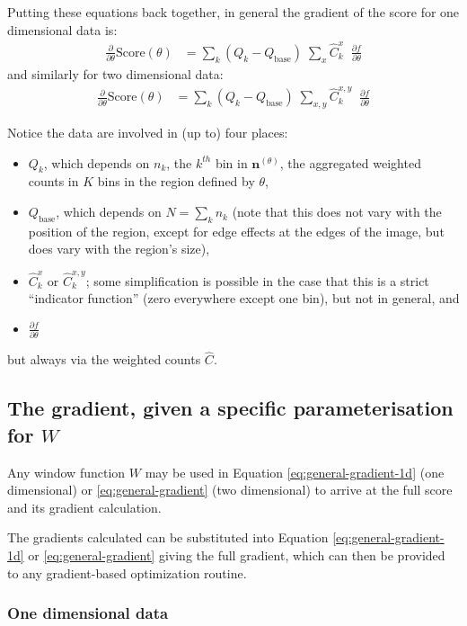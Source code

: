 Putting these equations back together, in general the gradient of the score for one dimensional data is:
\begin{align}
\frac{\partial}{\partial\theta}\text{Score}(\theta) 
&= \sum_k (Q_k - Q_\text{base}) \; \sum_{x} \hat{C}^{x}_k \;\; \frac{\partial f}{\partial\theta}
\label{eq:general-gradient-1d}
\end{align}
and similarly for two dimensional data:
\begin{align}
\frac{\partial}{\partial\theta}\text{Score}(\theta) 
&= \sum_k (Q_k - Q_\text{base}) \; \sum_{x,y} \hat{C}^{x,y}_k \;\; \frac{\partial f}{\partial\theta}
\label{eq:general-gradient}
\end{align}


Notice the data are involved in (up to) four places:
\begin{itemize}
\item $Q_k$, which depends on $n_k$, the $k^{th}$ bin in $\textbf{n}^{(\theta)}$, the aggregated weighted counts in $K$ bins in the region defined by $\theta$,
\item$Q_\text{base}$, which depends on $N=\sum_k{n_k}$ (note that this does not vary with the position of the region, except for edge effects at the edges of the image, but does vary with the region's size),
\item $\hat{C}^x_k$ or $\hat{C}^{x,y}_k$; some simplification is possible in the case that this is a strict ``indicator function'' (zero everywhere except one bin), but not in general, and
\item $\frac{\partial f}{\partial\theta}$
\end{itemize}
but always via the weighted counts $\hat{C}$. 

\subsection{The gradient, given a specific parameterisation for $W$}\label{sec:grad-score}

Any window function $W$ may be used in Equation \ref{eq:general-gradient-1d} (one dimensional) or \ref{eq:general-gradient} (two dimensional) to arrive at the full score and its gradient calculation. 

The gradients calculated can be substituted into Equation \ref{eq:general-gradient-1d} or \ref{eq:general-gradient} giving the full gradient, which can then be provided to any gradient-based optimization routine.

\subsubsection{One dimensional data}

